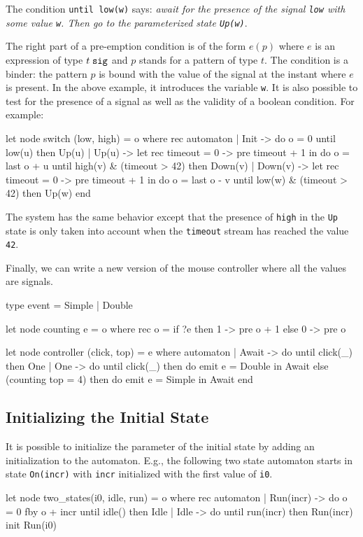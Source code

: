 \documentclass[11pt,titlepage,twoside]{report}
\begin{document}
The condition \verb-until low(w)- says: {\em await for the presence of
  the signal \verb-low- with some value \verb-w-. Then go to the
  parameterized state \verb-Up(w)-}.

\newcommand{\Signal}[1]{{#1}\;\mbox{\tt sig}}

The right part of a pre-emption condition is of the form $e(p)$ where
$e$ is an expression of type $\Signal{t}$ and $p$ stands for a pattern
of type $t$. The condition is a binder: the pattern $p$ is bound with
the value of the signal at the instant where $e$ is present.  In the
above example, it introduces the variable \verb-w-. It is also
possible to test for the presence of a signal as well as the validity
of a boolean condition. For example:
\begin{chklisting}[withresult]
let node switch (low, high) = o where
  rec automaton
  | Init -> do o = 0 until low(u) then Up(u)
  | Up(u) ->
      let rec timeout = 0 -> pre timeout + 1 in
      do o = last o + u
      until high(v) & (timeout > 42) then Down(v)
  | Down(v) ->
      let rec timeout = 0 -> pre timeout + 1 in
      do o = last o - v
      until low(w) & (timeout > 42) then Up(w)
  end
\end{chklisting}
The system has the same behavior except that the presence of
\verb-high- in the \verb-Up- state is only taken into account when the
\verb-timeout- stream has reached the value \verb-42-.

Finally, we can write a new version of the mouse controller where all
the values are signals.
\begin{chklisting}[withresult]
type event = Simple | Double

let node counting e = o where
  rec o = if ?e then 1 -> pre o + 1 else 0 -> pre o

let node controller (click, top) = e where
  automaton
  | Await ->
     do until click(_) then One
  | One ->
     do until click(_) then do emit e = Double in Await
     else (counting top = 4) then do emit e = Simple in Await
  end
\end{chklisting}

\subsection{Initializing the Initial State\label{initinitstate}} %

It is possible to initialize the parameter of the initial state by adding
an initialization to the automaton. E.g., the following two state automaton
starts in state \texttt{On(incr)} with \texttt{incr} initialized with the first
value of \texttt{i0}.
\begin{chklisting}[withresult]
let node two_states(i0, idle, run) = o where
  rec automaton
      | Run(incr) -> do o = 0 fby o + incr until idle() then Idle
      | Idle -> do until run(incr) then Run(incr)
      init Run(i0)
\end{chklisting}
\end{document}
